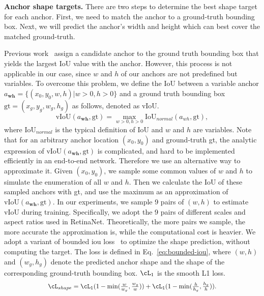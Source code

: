 \documentclass[10pt,twocolumn,letterpaper]{article}
\newcommand*{\Scale}[2][4]{\scalebox{#1}{$#2$}}
\begin{document}
\noindent
\textbf{Anchor shape targets.}
There are two steps to determine the best shape target for each anchor.
First, we need to match the anchor to a ground-truth bounding box.
Next, we will predict the anchor's width and height which can
best cover the matched ground-truth.

Previous work~\cite{ren2015faster} assign a candidate anchor to the ground
truth bounding box that yields the largest IoU value with the anchor.
However, this process is not applicable in our case, since $w$ and $h$
of our anchors are not predefined but variables.
To overcome this problem, we define the IoU between a variable anchor
$a_{\textbf{wh}}=\{(x_0,y_0,w,h)|w>0,h>0\}$
and a ground truth bounding box $\text{gt}=(x_g, y_g, w_g, h_g)$ as follows,
denoted as vIoU.
\begin{equation} \label{eq:shape_approx}
	\text{vIoU}(a_{\textbf{wh}}, \text{gt})=\max_{w>0,h>0}\text{IoU}_{normal}(a_{wh}, \text{gt}),
\end{equation}
where $\text{IoU}_{normal}$ is the typical definition of IoU and $w$ and $h$
are variables.
Note that for an arbitrary anchor location $(x_0, y_0)$ and ground-truth gt,
the analytic expression of $\text{vIoU}(a_{\textbf{wh}}, \text{gt})$ is complicated,
and hard to be implemented efficiently in an end-to-end network.
Therefore we use an alternative way to approximate it. Given $(x_0, y_0)$,
we sample some common values of $w$ and $h$ to simulate the enumeration of
all $w$ and $h$. Then we calculate the IoU of these sampled anchors with gt,
and use the maximum as an approximation of $\text{vIoU}(a_{\textbf{wh}}, \text{gt})$.
In our experiments, we sample 9 pairs of $(w, h)$ to estimate $\text{vIoU}$
during training.
Specifically, we adopt the 9 pairs of different scales and aspect ratios used
in RetinaNet\cite{lin2017focal}.
Theoretically, the more pairs we sample, the more accurate the approximation is,
while the computational cost is heavier.
We adopt a variant of bounded iou loss~\cite{tychsen2018improving} to optimize
the shape prediction, without computing the target.
The loss is defined in Eq.~\eqref{eq:bounded-iou}, where $(w,h)$ and
$(w_{g},h_{g})$ denote the predicted anchor shape and the shape
of the corresponding ground-truth bounding box. $\cL_{1}$ is the smooth L1 loss.
\begin{equation}
\Scale[0.91]{\cL_{shape}=\cL_{1}(1-\min({\frac{w}{w_{g}}, \frac{w_{g}}{w}})) + \cL_{1}(1-\min({\frac{h}{h_{g}}, \frac{h_{g}}{h}})).}
\label{eq:bounded-iou}
\end{equation}
\end{document}
